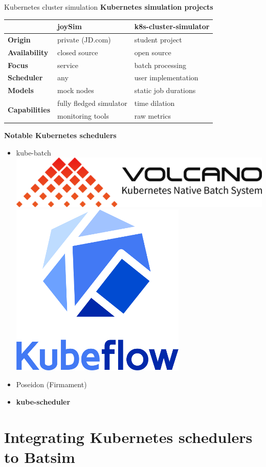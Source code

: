 \documentclass[12pt, aspectratio=43]{beamer}
\begin{document}
\begin{frame}{Kubernetes cluster simulation}
	\centering
	\textbf{Kubernetes simulation projects}
	\begin{adjustbox}{width=0.8\textwidth}
		\begin{tabular}{lll}
			\hline
			& \textbf{joySim} & \textbf{k8s-cluster-simulator} \\
			\hline\hline
			\textbf{Origin} & private (JD.com) & student project\\
			\textbf{Availability} & closed source & open source\\
			\textbf{Focus} & service & batch processing\\
			\textbf{Scheduler} & any & user implementation\\
			\textbf{Models} & mock nodes & static job durations\\
			\multirow[t]{2}{*}{\textbf{Capabilities}} & fully fledged simulator & time dilation\\ 
			& monitoring tools & raw metrics\\
			\hline
		\end{tabular}
	\end{adjustbox}
	
	\vspace{1ex}
	\textbf{Notable Kubernetes schedulers}
	\begin{itemize}
		\item kube-batch\\
			\smallskip
			\includegraphics[width=13ex]{../imgs/volcano-logo.png}\hspace{1ex}
			\includegraphics[width=6ex]{../imgs/kubeflow-logo.png}
		\item Poseidon (Firmament)
		\item \textbf{kube-scheduler}
	\end{itemize}
\end{frame}

\section{Integrating Kubernetes schedulers to Batsim}
\end{document}
